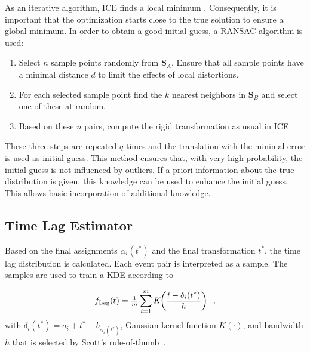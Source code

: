 \documentclass[conference]{IEEEtran}
\theoremstyle{examplestyle}
\begin{document}
As an iterative algorithm, \ac{ICE} finds a local minimum \cite{Do2008}. Consequently, it is important that the optimization starts close to the true solution to ensure a global minimum. In order to obtain a good initial guess, a \ac{RANSAC} \cite{Fischler1981} algorithm is used:
\begin{enumerate}
	\item Select \(n\) sample points randomly from \(\pmb{S}_A\). Ensure that all sample points have a minimal distance \(d\) to limit the effects of local distortions.
	\item For each selected sample point find the \(k\) nearest neighbors in \(\pmb{S}_B\) and select one of these at random.
	\item Based on these \(n\) pairs, compute the rigid transformation as usual in \ac{ICE}.
\end{enumerate}

These three steps are repeated \(q\) times and the translation with the minimal error is used as initial guess. This method ensures that, with very high probability, the initial guess is not influenced by outliers. If a priori information about the true distribution is given, this knowledge can be used to enhance the initial guess. This allows basic incorporation of additional knowledge.


\subsection{Time Lag Estimator} \label{sec:labestimator}
Based on the final assignments $\alpha_i(t^*)$ and the final transformation $t^*$, the time lag distribution is calculated. Each event pair is interpreted as a sample. The samples are used to train a \ac{KDE} according to

\begin{equation}
	\label{eq:solutionICP}
 f_{\text{Lag}}(t) = \tfrac{1}{m} \sum_{i=1}^m K\hspace{-1mm}\left( \frac{t - \delta_i(t^*)}{ h} \right) \enspace ,
	\end{equation}
with $\delta_i(t^*) = a_i + t^* - b_{\alpha_i(t^*)}$, Gaussian kernel function $K(\cdot)$, and bandwidth $h$ that is selected by Scott's rule-of-thumb~\cite{Scott1992}.
\end{document}
